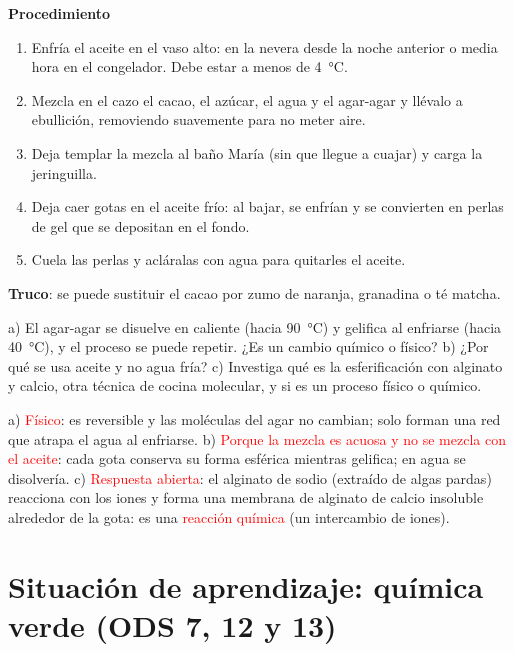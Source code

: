 \textbf{Procedimiento}
\begin{enumerate}[label=\numberballgreen]
    \item Enfría el aceite en el vaso alto: en la nevera desde la noche anterior o media hora en el congelador. Debe estar a menos
    de \qty{4}{\degreeCelsius}.
    \item Mezcla en el cazo el cacao, el azúcar, el agua y el agar-agar y llévalo a ebullición, removiendo suavemente para no meter
    aire.
    \item Deja templar la mezcla al baño María (sin que llegue a cuajar) y carga la jeringuilla.
    \item Deja caer gotas en el aceite frío: al bajar, se enfrían y se convierten en perlas de gel que se depositan en el fondo.
    \item Cuela las perlas y acláralas con agua para quitarles el aceite.
\end{enumerate}
\textbf{Truco}: se puede sustituir el cacao por zumo de naranja, granadina o té matcha.

\begin{exercise}
    a) El agar-agar se disuelve en caliente (hacia \qty{90}{\degreeCelsius}) y gelifica al enfriarse (hacia \qty{40}{\degreeCelsius}),
    y el proceso se puede repetir. ¿Es un cambio químico o físico? b) ¿Por qué se usa aceite y no agua fría? c) Investiga qué es la
    esferificación con alginato y calcio, otra técnica de cocina molecular, y si es un proceso físico o químico.
    \begin{solu}
        a) \textcolor{red}{Físico}: es reversible y las moléculas del agar no cambian; solo forman una red que atrapa el agua al
        enfriarse. b) \textcolor{red}{Porque la mezcla es acuosa y no se mezcla con el aceite}: cada gota conserva su forma
        esférica mientras gelifica; en agua se disolvería. c) \textcolor{red}{Respuesta abierta}: el alginato de sodio (extraído
        de algas pardas) reacciona con los iones  y forma una membrana de alginato de calcio insoluble alrededor de la
        gota: es una \textcolor{red}{reacción química} (un intercambio de iones).
    \end{solu}
\end{exercise}

\section{Situación de aprendizaje: química verde (ODS 7, 12 y 13)}\label{sec:ud6-ods}

